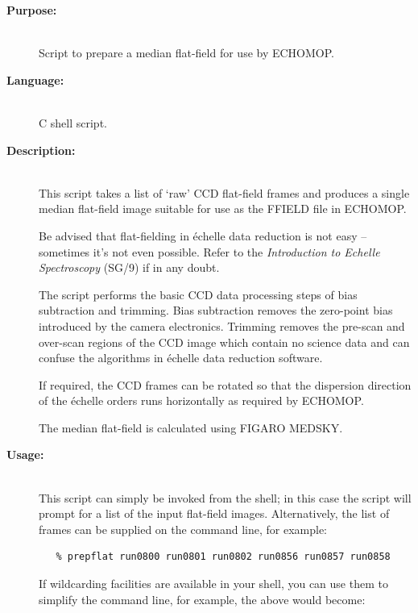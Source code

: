 \documentclass[twoside,11pt]{article}
\newcommand{\xref}[3]{#1}
\newcommand{\scspec}[2]{#1}
\newcommand{\scspec}[2]{#2}
\begin{document}
\begin{description}

\item [{\bf Purpose:}] \mbox{} \\
     Script to prepare a median flat-field for use by
     \xref{ECHOMOP}{sun152}{}.

\item [{\bf Language:}] \mbox{} \\
     C shell script.

\item [{\bf Description:}] \mbox{} \\
     This script takes a list of `raw' CCD flat-field frames and
     produces a single median flat-field image suitable for use as
     the FFIELD file in ECHOMOP.

     Be advised that flat-fielding in \'{e}chelle data reduction is not
     easy \scspec{--}{-} sometimes it's not even possible.  Refer to the
     \xref{{\sl Introduction to Echelle Spectroscopy}
     (SG/9)}{sg9}{flat_beware} if in any doubt.

     The script performs the basic CCD data processing steps of bias
     subtraction and trimming.  Bias subtraction removes the zero-point
     bias introduced by the camera electronics.  Trimming removes the
     pre-scan and over-scan regions of the CCD image which contain no
     science data and can confuse the algorithms in \'{e}chelle data
     reduction software.

     If required, the CCD frames can be rotated so that the dispersion
     direction of the \'{e}chelle orders runs horizontally as required by
     ECHOMOP.

     The median flat-field is calculated using FIGARO MEDSKY.

\item [{\bf Usage:}] \mbox{} \\
     This script can simply be invoked from the shell; in this case
     the script will prompt for a list of the input flat-field images.
     Alternatively, the list of frames can be supplied on the
     command line, for example:

\begin{verbatim}
   % prepflat run0800 run0801 run0802 run0856 run0857 run0858
\end{verbatim}

     If wildcarding facilities are available in your shell, you can use
     them to simplify the command line, for example, the above would
     become:


\end{description}
\end{document}
